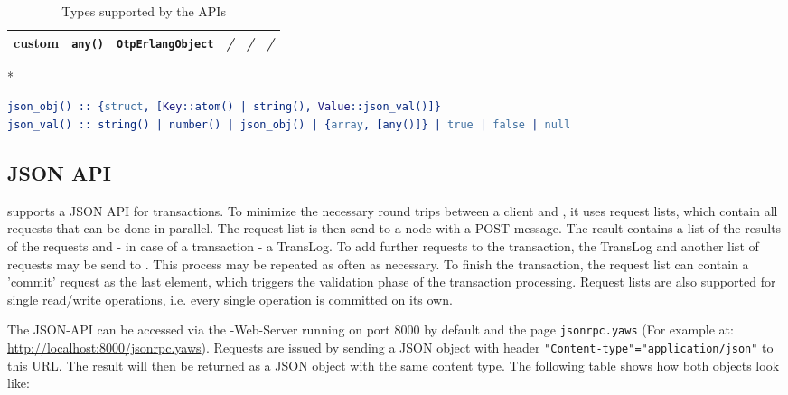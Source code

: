 \documentclass[a4paper]{scrreprt}
\newcommand{\code}[1]{\lstinline[basicstyle=\ttfamily]!#1!}
\begin{document}
\begin{table}
\begin{threeparttable}[b]
\begin{tabular}{llllll}
    custom     & \code{any()}      & \code{OtpErlangObject}       & \emph{/}                        & \emph{/}                  & \emph{/} \\
    \bottomrule
    \end{tabular}
    \begin{tablenotes}
      \item[*] ~\vspace{-1.5em}%
\begin{lstlisting}[language=erlang]
json_obj() :: {struct, [Key::atom() | string(), Value::json_val()]}
json_val() :: string() | number() | json_obj() | {array, [any()]} | true | false | null
\end{lstlisting}
    \end{tablenotes}
    \caption{Types supported by the \scalaris{} APIs}
    \label{api.supported_types}
  \end{threeparttable}
\end{table}

\subsection{JSON API}
\label{sec.api.json}

\scalaris{} supports a JSON API for transactions. To minimize the necessary
round trips between a client and \scalaris{}, it uses request lists, which
contain all requests that can be done in parallel. The request list is then
send to a \scalaris{} node with a POST message. The result contains
a list of the results of the requests and - in case of a transaction - a
TransLog. To add further
requests to the transaction, the TransLog and another list of requests may
be send to \scalaris{}. This process may be repeated as often as necessary.
To finish the transaction, the request list can contain a 'commit' request
as the last element, which triggers the validation phase of the transaction
processing.
Request lists are also supported for single read/write operations, i.e.
every single operation is committed on its own. 

The JSON-API can be accessed via the \scalaris{}-Web-Server running on port
8000 by default and the page \code{jsonrpc.yaws} (For example at:
\url{http://localhost:8000/jsonrpc.yaws}).
Requests are issued by sending a JSON object with header
\code{"Content-type"="application/json"} to this URL.
The result will then be returned as a JSON object with the same content type.
The following table shows how both objects look like:
\end{document}
